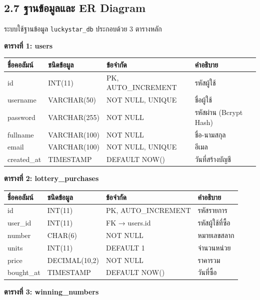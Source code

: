 \documentclass[a4paper,12pt]{article}
\begin{document}
\subsection*{2.7 ฐานข้อมูลและ ER Diagram}

ระบบใช้ฐานข้อมูล \texttt{luckystar\_db} ประกอบด้วย 3 ตารางหลัก

\vspace{0.4em}
\noindent\textbf{ตารางที่ 1: users}

\begin{tabularx}{\textwidth}{|l|l|l|X|}
\hline
\textbf{ชื่อคอลัมน์} & \textbf{ชนิดข้อมูล} & \textbf{ข้อจำกัด} & \textbf{คำอธิบาย} \\
\hline
id         & INT(11)      & PK, AUTO\_INCREMENT & รหัสผู้ใช้ \\
\hline
username   & VARCHAR(50)  & NOT NULL, UNIQUE & ชื่อผู้ใช้ \\
\hline
password   & VARCHAR(255) & NOT NULL & รหัสผ่าน (Bcrypt Hash) \\
\hline
fullname   & VARCHAR(100) & NOT NULL & ชื่อ-นามสกุล \\
\hline
email      & VARCHAR(100) & NOT NULL, UNIQUE & อีเมล \\
\hline
created\_at & TIMESTAMP   & DEFAULT NOW() & วันที่สร้างบัญชี \\
\hline
\end{tabularx}

\newpage

\noindent\textbf{ตารางที่ 2: lottery\_purchases}

\begin{tabularx}{\textwidth}{|l|l|l|X|}
\hline
\textbf{ชื่อคอลัมน์} & \textbf{ชนิดข้อมูล} & \textbf{ข้อจำกัด} & \textbf{คำอธิบาย} \\
\hline
id         & INT(11)       & PK, AUTO\_INCREMENT & รหัสรายการ \\
\hline
user\_id   & INT(11)       & FK → users.id & รหัสผู้ใช้ที่ซื้อ \\
\hline
number     & CHAR(6)       & NOT NULL & หมายเลขสลาก \\
\hline
units      & INT(11)       & DEFAULT 1 & จำนวนหน่วย \\
\hline
price      & DECIMAL(10,2) & NOT NULL & ราคารวม \\
\hline
bought\_at & TIMESTAMP     & DEFAULT NOW() & วันที่ซื้อ \\
\hline
\end{tabularx}

\vspace{0.6em}
\noindent\textbf{ตารางที่ 3: winning\_numbers}
\end{document}
